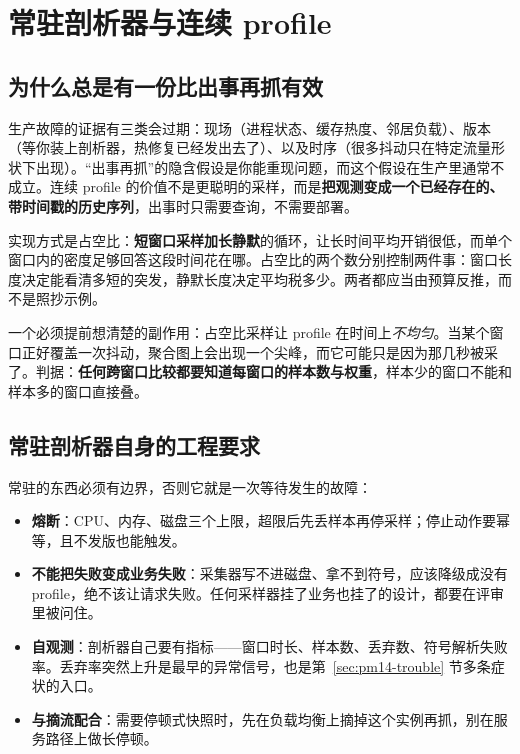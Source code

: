 \documentclass[12pt,a4paper,fontset=fandol]{ctexbook}
\begin{document}
\section{常驻剖析器与连续 profile}
\label{sec:pm14-continuous}

\subsection{为什么总是有一份比出事再抓有效}
\label{sub:pm14-always-on}

生产故障的证据有三类会过期：现场（进程状态、缓存热度、邻居负载）、版本（等你装上剖析器，热修复已经发出去了）、以及时序（很多抖动只在特定流量形状下出现）。``出事再抓''的隐含假设是你能重现问题，而这个假设在生产里通常不成立。连续 profile 的价值不是更聪明的采样，而是\textbf{把观测变成一个已经存在的、带时间戳的历史序列}，出事时只需要查询，不需要部署。

实现方式是占空比：\textbf{短窗口采样加长静默}的循环，让长时间平均开销很低，而单个窗口内的密度足够回答这段时间花在哪。占空比的两个数分别控制两件事：窗口长度决定能看清多短的突发，静默长度决定平均税多少。两者都应当由预算反推，而不是照抄示例。

一个必须提前想清楚的副作用：占空比采样让 profile 在时间上\emph{不均匀}。当某个窗口正好覆盖一次抖动，聚合图上会出现一个尖峰，而它可能只是因为那几秒被采了。判据：\textbf{任何跨窗口比较都要知道每窗口的样本数与权重}，样本少的窗口不能和样本多的窗口直接叠。

\subsection{常驻剖析器自身的工程要求}
\label{sub:pm14-daemon}

常驻的东西必须有边界，否则它就是一次等待发生的故障：

\begin{itemize}
  \item \textbf{熔断}：CPU、内存、磁盘三个上限，超限后先丢样本再停采样；停止动作要幂等，且不发版也能触发。
  \item \textbf{不能把失败变成业务失败}：采集器写不进磁盘、拿不到符号，应该降级成没有 profile，绝不该让请求失败。任何采样器挂了业务也挂了的设计，都要在评审里被问住。
  \item \textbf{自观测}：剖析器自己要有指标——窗口时长、样本数、丢弃数、符号解析失败率。丢弃率突然上升是最早的异常信号，也是第~\ref{sec:pm14-trouble} 节多条症状的入口。
  \item \textbf{与摘流配合}：需要停顿式快照时，先在负载均衡上摘掉这个实例再抓，别在服务路径上做长停顿。
\end{itemize}
\end{document}
